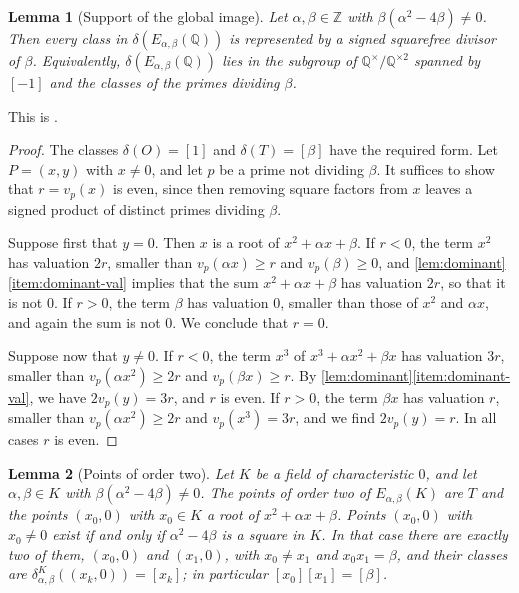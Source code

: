 \documentclass[12pt,oneside,openany]{book}
\theoremstyle{definition}
\theoremstyle{plain}
\numberwithin{equation}{chapter}
\theoremstyle{plain}
\newtheorem{lemma}[lemma]{Lemma}
\theoremstyle{definition}
\theoremstyle{remark}
\newcommand{\Q}{\mathbb Q}
\newcommand{\Z}{\mathbb Z}
\newcommand{\sq}[1]{[#1]}
\newcommand{\sqgp}[1]{#1^{\times}/#1^{\times2}}
\begin{document}
\begin{lemma}[Support of the global image]\label{lem:support}
Let $\alpha,\beta\in\Z$ with $\beta(\alpha^2-4\beta)\ne0$. Then every class in $\delta(E_{\alpha,\beta}(\Q))$ is represented by a signed squarefree divisor of $\beta$. Equivalently, $\delta(E_{\alpha,\beta}(\Q))$ lies in the subgroup of $\sqgp\Q$ spanned by $\sq{-1}$ and the classes of the primes dividing $\beta$.
\end{lemma}

This is \cite[Proposition~3.8(c)]{SilvermanTate2015}.

\begin{proof}
The classes $\delta(O)=\sq1$ and $\delta(T)=\sq\beta$ have the required form. Let $P=(x,y)$ with $x\ne0$, and let $p$ be a prime not dividing $\beta$. It suffices to show that $r=v_p(x)$ is even, since then removing square factors from $x$ leaves a signed product of distinct primes dividing $\beta$.

Suppose first that $y=0$. Then $x$ is a root of $x^2+\alpha x+\beta$. If $r<0$, the term $x^2$ has valuation $2r$, smaller than $v_p(\alpha x)\ge r$ and $v_p(\beta)\ge0$, and \cref{lem:dominant}\ref{item:dominant-val} implies that the sum $x^2+\alpha x+\beta$ has valuation $2r$, so that it is not $0$. If $r>0$, the term $\beta$ has valuation $0$, smaller than those of $x^2$ and $\alpha x$, and again the sum is not $0$. We conclude that $r=0$.

Suppose now that $y\ne0$. If $r<0$, the term $x^3$ of $x^3+\alpha x^2+\beta x$ has valuation $3r$, smaller than $v_p(\alpha x^2)\ge2r$ and $v_p(\beta x)\ge r$. By \cref{lem:dominant}\ref{item:dominant-val}, we have $2v_p(y)=3r$, and $r$ is even. If $r>0$, the term $\beta x$ has valuation $r$, smaller than $v_p(\alpha x^2)\ge2r$ and $v_p(x^3)=3r$, and we find $2v_p(y)=r$. In all cases $r$ is even.
\end{proof}

\begin{lemma}[Points of order two]\label{lem:two-torsion}
Let $K$ be a field of characteristic $0$, and let $\alpha,\beta\in K$ with $\beta(\alpha^2-4\beta)\ne0$. The points of order two of $E_{\alpha,\beta}(K)$ are $T$ and the points $(x_0,0)$ with $x_0\in K$ a root of $x^2+\alpha x+\beta$. Points $(x_0,0)$ with $x_0\ne0$ exist if and only if $\alpha^2-4\beta$ is a square in $K$. In that case there are exactly two of them, $(x_0,0)$ and $(x_1,0)$, with $x_0\ne x_1$ and $x_0x_1=\beta$, and their classes are $\delta^K_{\alpha,\beta}((x_k,0))=\sq{x_k}$; in particular $\sq{x_0}\sq{x_1}=\sq\beta$.
\end{lemma}
\end{document}
